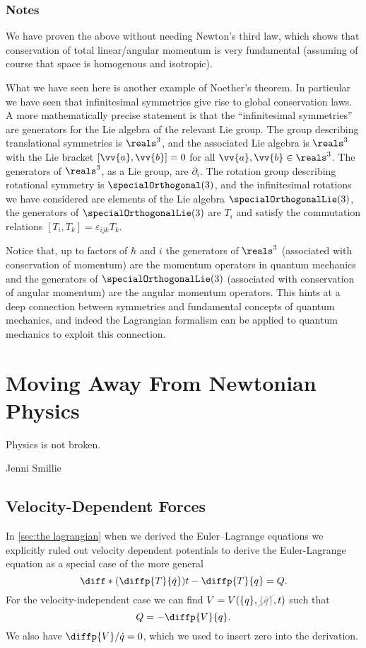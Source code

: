 \documentclass[fleqn]{NotesClass}
\newcommand*{\nodependence}[1]{\textcolor{gray}{\cancel{#1}}}
\begin{document}
    \subsection{Notes}
    We have proven the above without needing Newton's third law, which shows that conservation of total linear/angular momentum is very fundamental (assuming of course that space is homogenous and isotropic).
    
    What we have seen here is another example of Noether's theorem.
    In particular we have seen that infinitesimal symmetries give rise to global conservation laws.
    A more mathematically precise statement is that the \enquote{infinitesimal symmetries} are generators for the Lie algebra of the relevant Lie group.
    The group describing translational symmetries is \(\reals^3\), and the associated Lie algebra is \(\reals^3\) with the Lie bracket \([\vv{a}, \vv{b}] = 0\) for all \(\vv{a}, \vv{b} \in \reals^3\).
    The generators of \(\reals^3\), as a Lie group, are \(\partial_i\).
    The rotation group describing rotational symmetry is \(\specialOrthogonal(3)\), and the infinitesimal rotations we have considered are elements of the Lie algebra \(\specialOrthogonalLie(3)\), the generators of \(\specialOrthogonalLie(3)\) are \(T_i\) and satisfy the commutation relations \([T_{i}, T_{k}] = \varepsilon_{ijk}T_k\).
    
    Notice that, up to factors of \(\hbar\) and \(i\) the generators of \(\reals^3\) (associated with conservation of momentum) are the momentum operators in quantum mechanics and the generators of \(\specialOrthogonalLie(3)\) (associated with conservation of angular momentum) are the angular momentum operators.
    This hints at a deep connection between symmetries and fundamental concepts of quantum mechanics, and indeed the Lagrangian formalism can be applied to quantum mechanics to exploit this connection.
    
    \chapter{Moving Away From Newtonian Physics}
    \epigraph{Physics is not broken.}{Jenni Smillie}
    \section{Velocity-Dependent Forces}
    In \cref{sec:the lagrangian} when we derived the Euler--Lagrange equations we explicitly ruled out velocity dependent potentials to derive the Euler-Lagrange equation as a special case of the more general
    \begin{equation}
        \diff*{\left( \diffp{T}{\dot{q}} \right)}{t} - \diffp{T}{q} = Q.
    \end{equation}
    For the velocity-independent case we can find \(V = V(\{q\}, \nodependence{\{\dot{q}\}}, t)\) such that
    \begin{equation}
        Q = - \diffp{V}{q}.
    \end{equation}
    We also have \(\diffp{V}/{\dot{q}} = 0\), which we used to insert zero into the derivation.
    
\end{document}
